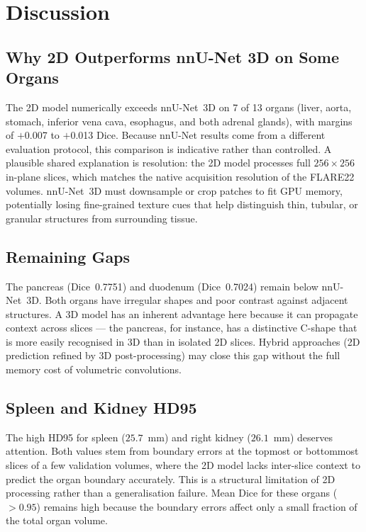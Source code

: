 \section{Discussion}

\subsection{Why 2D Outperforms nnU-Net 3D on Some Organs}

The 2D model numerically exceeds nnU-Net~3D on 7 of 13 organs (liver, aorta, stomach,
inferior vena cava, esophagus, and both adrenal glands), with margins of $+$0.007 to
$+$0.013 Dice. Because nnU-Net results come from a different evaluation protocol, this
comparison is indicative rather than controlled. A plausible shared explanation is resolution:
the 2D model processes full $256 \times 256$ in-plane slices, which matches the native
acquisition resolution of the FLARE22 volumes. nnU-Net~3D must downsample or crop patches to
fit GPU memory, potentially losing fine-grained texture cues that help distinguish thin,
tubular, or granular structures from surrounding tissue.

\subsection{Remaining Gaps}

The pancreas (Dice~0.7751) and duodenum (Dice~0.7024) remain below nnU-Net~3D. Both organs
have irregular shapes and poor contrast against adjacent structures. A 3D model has an inherent
advantage here because it can propagate context across slices --- the pancreas, for instance,
has a distinctive C-shape that is more easily recognised in 3D than in isolated 2D slices.
Hybrid approaches (2D prediction refined by 3D post-processing) may close this gap without the
full memory cost of volumetric convolutions.

\subsection{Spleen and Kidney HD95}

The high HD95 for spleen ($25.7$~mm) and right kidney ($26.1$~mm) deserves attention. Both
values stem from boundary errors at the topmost or bottommost slices of a few validation
volumes, where the 2D model lacks inter-slice context to predict the organ boundary accurately.
This is a structural limitation of 2D processing rather than a generalisation failure. Mean
Dice for these organs ($> 0.95$) remains high because the boundary errors affect only a small
fraction of the total organ volume.

